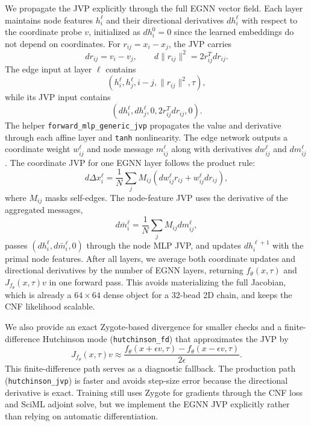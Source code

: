 \documentclass[reprint,amsmath,amssymb,aps,pra,10pt]{revtex4-2}
\begin{document}
We propagate the JVP explicitly through the full EGNN vector field.
Each layer maintains node features $h_i^\ell$ and their directional derivatives $dh_i^\ell$ with respect to the coordinate probe $v$, initialized as $dh_i^0=0$ since the learned embeddings do not depend on coordinates.
For $r_{ij}=x_i-x_j$, the JVP carries
\begin{equation}
    dr_{ij}=v_i-v_j,
    \qquad
    d\|r_{ij}\|^2
    =
    2r_{ij}^{T}dr_{ij}.
\end{equation}
The edge input at layer $\ell$ contains
\begin{equation}
    \left(
        h_i^\ell,
        h_j^\ell,
        i-j,
        \|r_{ij}\|^2,
        \tau
    \right),
\end{equation}
while its JVP input contains
\begin{equation}
    \left(
        dh_i^\ell,
        dh_j^\ell,
        0,
        2r_{ij}^{T}dr_{ij},
        0
    \right).
\end{equation}
The helper \texttt{forward\_mlp\_generic\_jvp} propagates the value and derivative through each affine layer and \texttt{tanh} nonlinearity.
The edge network outputs a coordinate weight $w_{ij}^\ell$ and node message $m_{ij}^\ell$ along with derivatives $dw_{ij}^\ell$ and $dm_{ij}^\ell$.
The coordinate JVP for one EGNN layer follows the product rule:
\begin{equation}
    d\Delta x_i^\ell
    =
    \frac{1}{N}
    \sum_j
    M_{ij}
    \left(
        dw_{ij}^\ell r_{ij}
        +
        w_{ij}^\ell dr_{ij}
    \right),
\end{equation}
where $M_{ij}$ masks self-edges.
The node-feature JVP uses the derivative of the aggregated messages,
\begin{equation}
    d\bar{m}_i^\ell
    =
    \frac{1}{N}
    \sum_j
    M_{ij}dm_{ij}^\ell,
\end{equation}
passes $(dh_i^\ell,d\bar{m}_i^\ell,0)$ through the node MLP JVP, and updates $dh_i^{\ell+1}$ with the primal node features.
After all layers, we average both coordinate updates and directional derivatives by the number of EGNN layers, returning $f_\theta(x,\tau)$ and $J_{f_\theta}(x,\tau)v$ in one forward pass.
This avoids materializing the full Jacobian, which is already a $64 \times 64$ dense object for a 32-bead 2D chain, and keeps the CNF likelihood scalable.

We also provide an exact Zygote-based divergence for smaller checks and a finite-difference Hutchinson mode (\texttt{hutchinson\_fd}) that approximates the JVP by
\begin{equation}
    J_{f_\theta}(x,\tau)v
    \approx
    \frac{
        f_\theta(x+\epsilon v,\tau)
        -
        f_\theta(x-\epsilon v,\tau)
    }{2\epsilon}.
\end{equation}
This finite-difference path serves as a diagnostic fallback.
The production path (\texttt{hutchinson\_jvp}) is faster and avoids step-size error because the directional derivative is exact.
Training still uses Zygote for gradients through the CNF loss and SciML adjoint solve, but we implement the EGNN JVP explicitly rather than relying on automatic differentiation.
\end{document}
